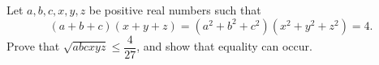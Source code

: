 Let $a,b,c,x,y,z$ be positive real numbers such that
\[
(a+b+c)(x+y+z)=\left(a^2+b^2+c^2\right)\left(x^2+y^2+z^2\right)=4 .
\]
Prove that $\sqrt{abcxyz}\le\dfrac{4}{27}$, and show that equality can occur.
